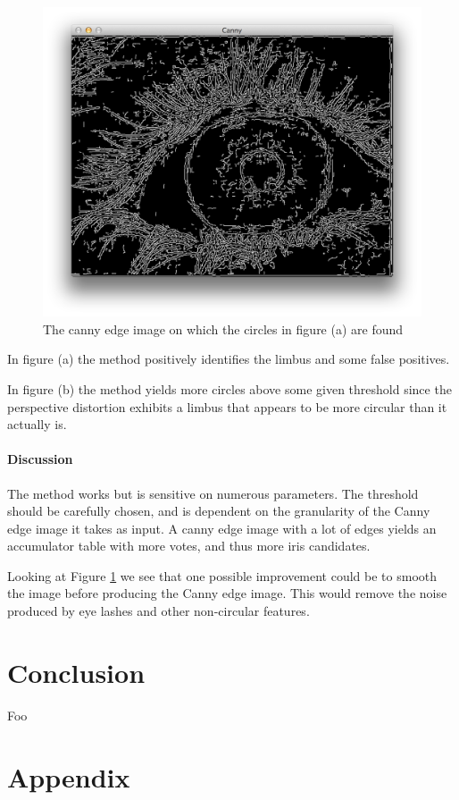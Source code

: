 \documentclass[a4paper,11pt]{article}
\begin{document}
\begin{figure}[H]
\centering
  \includegraphics[width=.8\linewidth]{houghcanny}
  \caption{The canny edge image on which the circles in figure (a) are found}
  \label{fig:canny}
\end{figure}
In figure (a) the method positively identifies the limbus and some false positives.

In figure (b) the method yields more circles above some given threshold since the perspective distortion exhibits a limbus that appears to be more circular than it actually is.

\paragraph{Discussion} %
\label{par:discussion}
The method works but is sensitive on numerous parameters. The threshold should be carefully chosen, and is dependent on the granularity of the Canny edge image it takes as input. A canny edge image with a lot of edges yields an accumulator table with more votes, and thus more iris candidates.

Looking at Figure \ref{fig:canny} we see that one possible improvement could be to smooth the image before producing the Canny edge image. This would remove the noise produced by eye lashes and other non-circular features.




\section{Conclusion}

\newpage

\begin{thebibliography}{}

Foo
\end{thebibliography}

\section*{Appendix}
%
\end{document}
